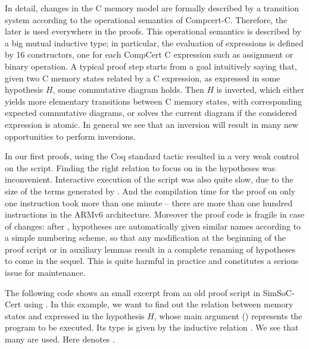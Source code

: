 In detail,
changes in the C memory model are formally described
by a transition system according to the operational semantics of Compcert-C.
Therefore, the later is used everywhere in the proofs. 
This operational semantics is described by
a big mutual inductive type;
in particular, the evaluation of expressions is defined by
16 constructors, one for each CompCert C expression such as assignment or binary
operation.
A typical proof step starts from a goal intuitively saying that,
given two C memory states related by a C expression,
as expressed in some hypothesis $H$, 
some commutative diagram holds.
Then $H$ is inverted, which either yields more elementary 
transitions between C memory states, 
with corresponding expected commutative diagrams,
or solves the current diagram if the considered expression
is atomic. 
In general we see that an inversion will result in many
new opportunities to perform inversions.

In our first proofs, using the Coq standard \inversion tactic
resulted in a very weak control on the script.
Finding the right relation to focus on in the hypotheses
was inconvenient.
Interactive execution of the script was also quite slow,
due to the size of the terms generated by \inversion.
And the compilation time for the proof on only one instruction 
took more than one minute --
there are more than one hundred instructions in the ARMv6 architecture.
Moreover
the proof code is fragile in case of changes: 
after \inversion, hypotheses are automatically given similar names 
according to a simple numbering scheme,
so that any modification at the beginning of the proof script
or in auxiliary lemmas 
result in a complete renaming of hypotheses to come in the sequel.
This is quite harmful in practice and constitutes
a serious issue for maintenance.

The following code shows an small excerpt from 
an old proof script in SimSoC-Cert using \inversion.
In this example, we want to find out the relation between memory states
 and  expressed in the hypothesis $H$,
whose main argument ()
represents the program to be executed.
Its type is given by the inductive relation .
We see that many  are used.
Here  denotes .

